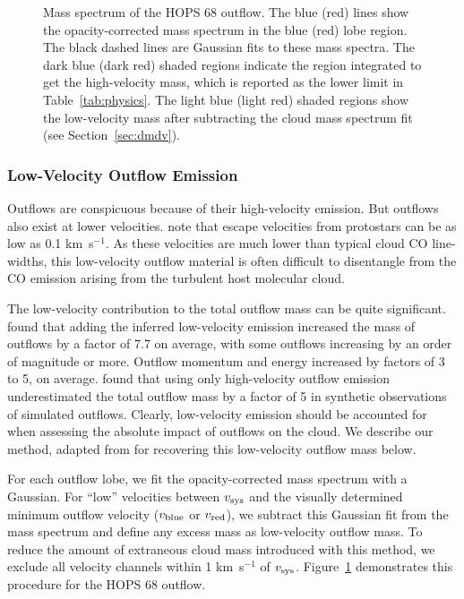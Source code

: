 \documentclass[twocolumn]{aastex63}
\newcommand{\example}{HOPS 68}
\newcommand{\kms}{km~s$^{-1}$}
\begin{document}
\begin{figure}
\caption{Mass spectrum of the \example{} outflow. The blue (red) lines show the opacity-corrected mass spectrum in the blue (red) lobe region. The black dashed lines are Gaussian fits to these mass spectra. The dark blue (dark red) shaded regions indicate the region integrated to get the high-velocity mass, which is reported as the lower limit in Table~\ref{tab:physics}. The light blue (light red) shaded regions show the low-velocity mass after subtracting the cloud mass spectrum fit (see Section~\ref{sec:dmdv}).\label{fig:dmdv}}
\end{figure}

\subsubsection{Low-Velocity Outflow Emission}\label{sec:lowvelocity}
Outflows are conspicuous because of their high-velocity emission. But outflows also exist at lower velocities. \citet{Dunham14} note that escape velocities from protostars can be as low as 0.1 \kms. As these velocities are much lower than typical cloud CO line-widths, this low-velocity outflow material is often difficult to disentangle from the CO emission arising from the turbulent host molecular cloud.  

The low-velocity contribution to the total outflow mass can be quite significant. \citet{Dunham14} found that adding the inferred low-velocity emission increased the mass of outflows by a factor of 7.7 on average, with some outflows increasing by an order of magnitude or more. Outflow momentum and energy increased by factors of 3 to 5, on average. \citet{Offner11} found that using only high-velocity outflow emission underestimated the total outflow mass by a factor of 5 in synthetic observations of simulated outflows. Clearly, low-velocity emission should be accounted for when assessing the absolute impact of outflows on the cloud. We describe our method, adapted from \citet{Dunham14} for recovering this low-velocity outflow mass below. 

For each outflow lobe, we fit the opacity-corrected mass spectrum with a Gaussian. For ``low'' velocities between $v_{\rm sys}$ and the visually determined minimum outflow velocity ($v_{\rm blue}$ or $v_{\rm red}$), we subtract this Gaussian fit from the mass spectrum and define any excess mass as low-velocity outflow mass. To reduce the amount of extraneous cloud mass introduced with this method, we exclude all velocity channels within 1 \kms{} of $v_{\rm sys}$. Figure~\ref{fig:dmdv} demonstrates this procedure for the \example{} outflow. 
\end{document}
